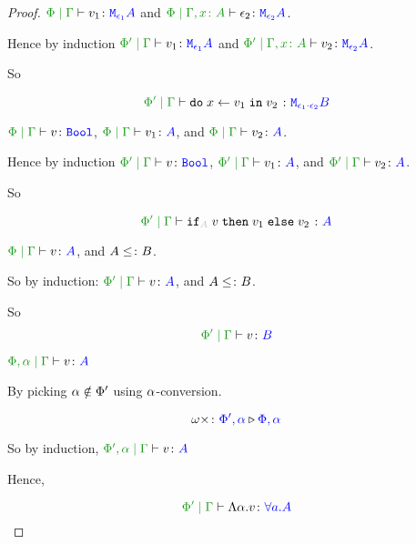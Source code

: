 \documentclass{report}
\begin{document}
\begin{framed}
\begin{proof}
            \bi $\gpetyperelation{v_1}{\M{\e_1}{A}}$ and $\etyperelation{\P}{\gax}{\e_2}{\M{\e_2}{A}}$.
        
            Hence by induction $\gppetyperelation{v_1}{\M{\e_1}{A}}$ and $\etyperelation{\P'}{\gax}{v_2}{\M{\e_2}{A}}$.
        
            So
        
            \begin{equation}
                \gppetyperelation{\doin{x}{v_1}{v_2}}{\M{\e_1\dot\e_2}{B}}
            \end{equation}
        
        
            \bi $\gpetyperelation{v}{\B}$, $\gpetyperelation{v_1}{A}$, and $\gpetyperelation{v_2}{A}$.
        
            Hence by induction
            $\gppetyperelation{v}{\B}$, $\gppetyperelation{v_1}{A}$, and $\gppetyperelation{v_2}{A}$.
        
            So 
        
            \begin{equation}
                \gppetyperelation{\pifthenelse{A}{v}{v_1}{v_2}}{A}
            \end{equation}
        
            \bi $\gpetyperelation{v}{A}$, and $A\leq\colon B$.
        
            So by induction:
            $\gppetyperelation{v}{A}$, and $A\leq\colon B$.
        
            So \begin{equation}
                \gppetyperelation{v}{B}
            \end{equation}
        
            \bi $\etyperelation{\P, \a}{\G}{v}{A}$
        
            By picking $\alpha\notin\Phi'$ using $\alpha$-conversion.
        
            \begin{equation}
                \omega\times \colon {\color{blue}\Phi',\alpha} \triangleright {\color {blue} \Phi,\alpha}
            \end{equation}
        
            So by induction, $\etyperelation{\P', \a}{\G}{v}{A}$
        
            Hence,
        
            \begin{equation}
                \gppetyperelation{\elam{\a}{v}}{\all{a}{A}}
            \end{equation}
        

\end{proof}
\end{framed}
\end{document}
